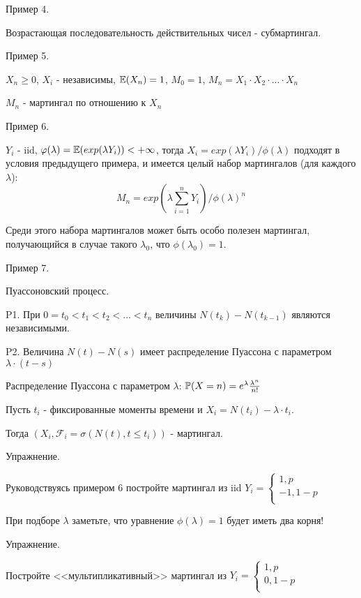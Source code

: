 {Пример 4. \par
Возрастающая последовательность действительных чисел -
субмартингал. \par

Пример 5. \par
$X_{n}\ge 0$, $X_{i}$ - независимы, $\E(X_{n})=1$, $M_{0}=1$,
$M_{n}=X_{1}\cdot X_{2}
\cdot ... \cdot X_{n}$ \par
$M_{n}$ - мартингал по отношению к $X_{n}$ \par

Пример 6. \par
$Y_{i}$ - iid, $\phi(\lambda)=\E(exp(\lambda Y_{i}))<+\infty$,
тогда $X_{i}=exp(\lambda Y_{i})/\phi(\lambda)$ подходят в условия
предыдущего примера, и имеется целый набор мартингалов (для
каждого $\lambda$):
$$
M_{n}=exp\left(\lambda \sum_{i=1}^{n}
Y_{i}\right)/\phi(\lambda)^{n}
$$ \par
Среди этого набора мартингалов может быть особо полезен мартингал,
получающийся в случае такого $\lambda_{0}$, что
$\phi(\lambda_{0})=1$. \par

Пример 7. \par
Пуассоновский процесс. \par
P1. При $0=t_{0}<t_{1}<t_{2}<...<t_{n}$ величины
$N(t_{k})-N(t_{k-1})$ являются независимыми. \par
P2. Величина $N(t)-N(s)$ имеет распределение Пуассона с параметром
$\lambda \cdot (t-s)$ \par

Распределение Пуассона с параметром $\lambda$:
$\P(X=n)=e^{\lambda}\frac{\lambda^{n}}{n!}$ \par

Пусть $t_{i}$ - фиксированные моменты времени и
$X_{i}=N(t_{i})-\lambda\cdot t_{i}$. \par
Тогда $(X_{i},\mathcal{F}_{i}=\sigma(N(t),t\le t_{i}))$ -
мартингал. \par


Упражнение. \par
Руководствуясь примером 6 постройте мартингал из iid
$ Y_{i}=
\left\{
\begin{array}{rcl}
1, p \\
-1, 1-p \\
\end{array}
\right.
 $ \par
При подборе $\lambda$ заметьте, что уравнение $\phi(\lambda)=1$
будет иметь два корня!

Упражнение. \par
Постройте <<мультипликативный>> мартингал из $ Y_{i}= \left\{
\begin{array}{rcl}
1, p \\
0, 1-p \\
\end{array}
\right. $ \par

}
